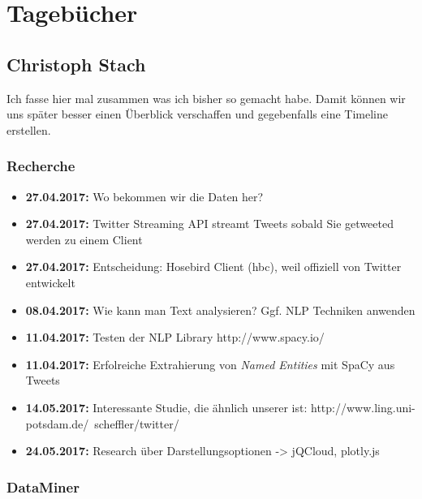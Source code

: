 \documentclass[12pt, 
	a4paper, 
	oneside, 
	leqno]{scrreprt}
\begin{document}
\chapter{Tagebücher}

\section{Christoph Stach}

Ich fasse hier mal zusammen was ich bisher so gemacht habe.
Damit können wir uns später besser einen Überblick verschaffen und gegebenfalls eine Timeline erstellen.

\subsection*{Recherche}

\begin{itemize}
  \item \textbf{27.04.2017:} Wo bekommen wir die Daten her?
  \item \textbf{27.04.2017:} Twitter Streaming API streamt Tweets sobald Sie getweeted werden zu einem Client
  \item \textbf{27.04.2017:} Entscheidung: Hosebird Client (hbc), weil offiziell von Twitter entwickelt
  \item \textbf{08.04.2017:} Wie kann man Text analysieren? Ggf. NLP Techniken anwenden
  \item \textbf{11.04.2017:} Testen der NLP Library http://www.spacy.io/
  \item \textbf{11.04.2017:} Erfolreiche Extrahierung von \textit{Named Entities} mit SpaCy aus Tweets
  \item \textbf{14.05.2017:} Interessante Studie, die ähnlich unserer ist: http://www.ling.uni-potsdam.de/~scheffler/twitter/
  \item \textbf{24.05.2017:} Research über Darstellungsoptionen -> jQCloud, plotly.js
\end{itemize}

\subsection*{DataMiner}
\end{document}
